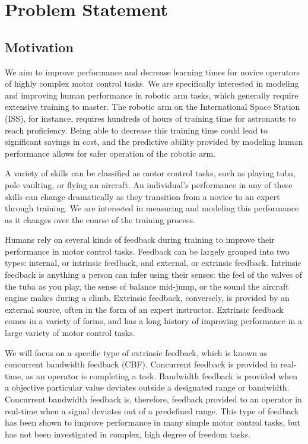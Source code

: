 \documentclass[float=false, crop=false]{standalone}
\begin{document}
\section{Problem Statement}
\subsection{Motivation}
We aim to improve performance and decrease learning times for novice operators of highly complex motor control tasks.
We are specifically interested in modeling and improving human performance in robotic arm tasks, which generally require extensive training to master.
The robotic arm on the International Space Station (ISS), for instance, requires hundreds of hours of training time for astronauts to reach proficiency.
Being able to decrease this training time could lead to significant savings in cost, and the predictive ability provided by modeling human performance allows for safer operation of the robotic arm.

A variety of skills can be classified as motor control tasks, such as playing tuba, pole vaulting, or flying an aircraft.
An individual's performance in any of these skills can change dramatically as they transition from a novice to an expert through training.
We are interested in measuring and modeling this performance as it changes over the course of the training process.

Humans rely on several kinds of feedback during training to improve their performance in motor control tasks.
Feedback can be largely grouped into two types: internal, or intrinsic feedback, and external, or extrinsic feedback.
Intrinsic feedback is anything a person can infer using their senses: the feel of the valves of the tuba as you play, the sense of balance mid-jump, or the sound the aircraft engine makes during a climb.
Extrinsic feedback, conversely, is provided by an external source, often in the form of an expert instructor.
Extrinsic feedback comes in a variety of forms, and has a long history of improving performance in a large variety of motor control tasks.

We will focus on a specific type of extrinsic feedback, which is known as concurrent bandwidth feedback (CBF).
Concurrent feedback is provided in real-time, as an operator is completing a task.
Bandwidth feedback is provided when a objective particular value deviates outside a designated range or bandwidth.
Concurrent bandwidth feedback is, therefore, feedback provided to an operator in real-time when a signal deviates out of a predefined range.
This type of feedback has been shown to improve performance in many simple motor control tasks, but has not been investigated in complex, high degree of freedom tasks.
\end{document}
